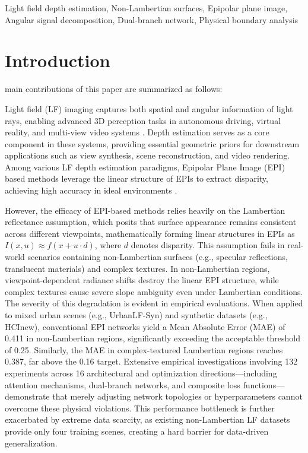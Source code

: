 \documentclass[lettersize,journal]{IEEEtran}
\begin{document}
\begin{IEEEkeywords}
Light field depth estimation, Non-Lambertian surfaces, Epipolar plane image, Angular signal decomposition, Dual-branch network, Physical boundary analysis
\end{IEEEkeywords}

\section{Introduction}

 main contributions of this paper are summarized as follows:

Light field (LF) imaging captures both spatial and angular information of light rays, enabling advanced 3D perception tasks in autonomous driving, virtual reality, and multi-view video systems . Depth estimation serves as a core component in these systems, providing essential geometric priors for downstream applications such as view synthesis, scene reconstruction, and video rendering. Among various LF depth estimation paradigms, Epipolar Plane Image (EPI) based methods leverage the linear structure of EPIs to extract disparity, achieving high accuracy in ideal environments .

However, the efficacy of EPI-based methods relies heavily on the Lambertian reflectance assumption, which posits that surface appearance remains consistent across different viewpoints, mathematically forming linear structures in EPIs as $I(x, u) \approx f(x + u \cdot d)$, where $d$ denotes disparity. This assumption fails in real-world scenarios containing non-Lambertian surfaces (e.g., specular reflections, translucent materials) and complex textures. In non-Lambertian regions, viewpoint-dependent radiance shifts destroy the linear EPI structure, while complex textures cause severe slope ambiguity even under Lambertian conditions. The severity of this degradation is evident in empirical evaluations. When applied to mixed urban scenes (e.g., UrbanLF-Syn) and synthetic datasets (e.g., HCInew), conventional EPI networks yield a Mean Absolute Error (MAE) of 0.411 in non-Lambertian regions, significantly exceeding the acceptable threshold of 0.25. Similarly, the MAE in complex-textured Lambertian regions reaches 0.387, far above the 0.16 target. Extensive empirical investigations involving 132 experiments across 16 architectural and optimization directions---including attention mechanisms, dual-branch networks, and composite loss functions---demonstrate that merely adjusting network topologies or hyperparameters cannot overcome these physical violations. This performance bottleneck is further exacerbated by extreme data scarcity, as existing non-Lambertian LF datasets provide only four training scenes, creating a hard barrier for data-driven generalization.
\end{document}

